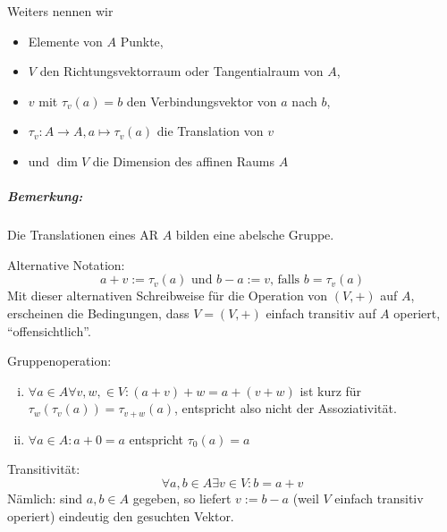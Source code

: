 \begin{figure}\centering
{}
\end{figure}

	Weiters nennen wir
		\begin{itemize}
			\item Elemente von $ A $ Punkte,
			\item $ V $ den Richtungsvektorraum oder Tangentialraum von $ A $,
			\item $ v $ mit $ \tau_v(a)=b $ den Verbindungsvektor von $ a $ nach $ b $,
			\item $ \tau_v:A\to A, a\mapsto \tau_v(a) $ die Translation von $ v $
			\item und $ \dim V $ die Dimension des affinen Raums $ A $
		\end{itemize}
		
\subparagraph{Bemerkung: }
	Die Translationen eines AR $ A $ bilden eine abelsche Gruppe.
	
	Alternative Notation:
		\[ a+v:=\tau_v(a) \text{ und } b-a:= v\text{, falls } b=\tau_v(a) \]
	Mit dieser alternativen Schreibweise für die Operation von $ (V,+) $ auf $ A $, erscheinen die Bedingungen, dass $ V=(V,+) $ einfach transitiv auf $ A $ operiert, "`offensichtlich"'.
	
	Gruppenoperation:
		\begin{enumerate}[(i)]
			\item $ \forall a\in A\forall v,w,\in V: (a+v)+w = a+(v+w) $ ist kurz für $ \tau_w(\tau_v(a)) = \tau_{v+w}(a) $, entspricht also nicht der Assoziativität.
			\item $ \forall a\in A:a+0=a $ entspricht $ \tau_0(a) = a $
		\end{enumerate}
	Transitivität:
		\[ \forall a,b\in A\exists v\in V: b=a+v \]
	Nämlich: sind $ a,b\in A $ gegeben, so liefert $ v:=b-a $ (weil $ V $ einfach transitiv operiert) eindeutig den gesuchten Vektor.

